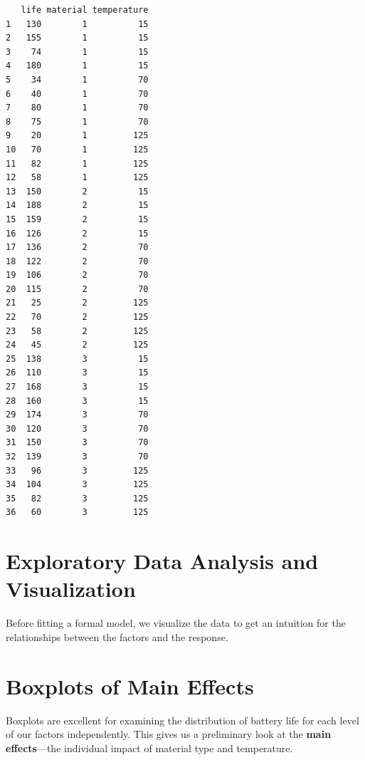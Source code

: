 \documentclass[
  letterpaper,
  DIV=11,
  numbers=noendperiod]{scrreprt}
\begin{document}
\begin{verbatim}
   life material temperature
1   130        1          15
2   155        1          15
3    74        1          15
4   180        1          15
5    34        1          70
6    40        1          70
7    80        1          70
8    75        1          70
9    20        1         125
10   70        1         125
11   82        1         125
12   58        1         125
13  150        2          15
14  188        2          15
15  159        2          15
16  126        2          15
17  136        2          70
18  122        2          70
19  106        2          70
20  115        2          70
21   25        2         125
22   70        2         125
23   58        2         125
24   45        2         125
25  138        3          15
26  110        3          15
27  168        3          15
28  160        3          15
29  174        3          70
30  120        3          70
31  150        3          70
32  139        3          70
33   96        3         125
34  104        3         125
35   82        3         125
36   60        3         125
\end{verbatim}

\section{Exploratory Data Analysis and
Visualization}\label{exploratory-data-analysis-and-visualization}

Before fitting a formal model, we visualize the data to get an intuition
for the relationships between the factors and the response.

\section{Boxplots of Main Effects}\label{boxplots-of-main-effects}

Boxplots are excellent for examining the distribution of battery life
for each level of our factors independently. This gives us a preliminary
look at the \textbf{main effects}---the individual impact of material
type and temperature.
\end{document}

